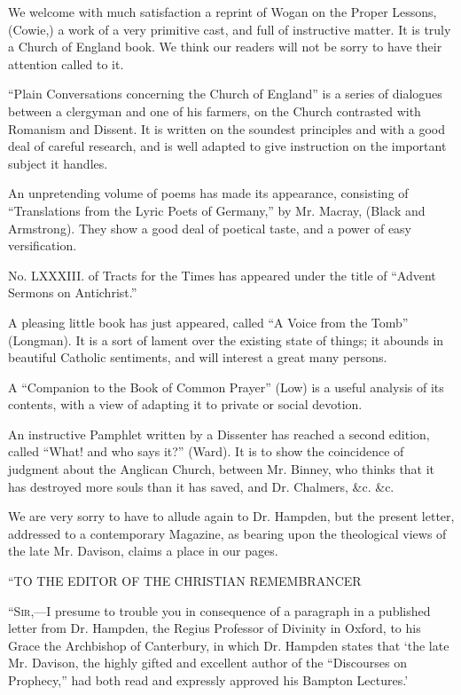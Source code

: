 We welcome with much satisfaction a reprint of
Wogan on the Proper Lessons, (Cowie,) a work of a very primitive cast,
and full of instructive matter. It is truly a Church of England book. We
think our readers will not be sorry to have their attention called to
it.

``Plain Conversations concerning the Church of
England'' is a series of dialogues between a clergyman and one of his
farmers, on the Church contrasted with Romanism and Dissent. It is
written on the soundest principles and with a good deal of careful
research, and is well adapted to give instruction on the important
subject it handles.

An unpretending volume of poems has made its
appearance, consisting of ``Translations from the Lyric Poets of Germany,''
by Mr. Macray, (Black and Armstrong). They show a good deal of poetical
taste, and a power of easy versification.

No. LXXXIII. of Tracts for the Times has appeared
under the title of ``Advent Sermons on Antichrist.''

A pleasing little book has just appeared, called ``A
Voice from the Tomb'' (Longman). It is a sort of lament over the existing
state of things; it abounds in beautiful Catholic sentiments, and will
interest a great many persons.

A ``Companion to the Book of Common Prayer'' (Low) is
a useful analysis of its contents, with a view of adapting it to private
or social devotion.

An instructive Pamphlet written by a Dissenter has
reached a second edition, called ``What! and who says it?'' (Ward). It is
to show the coincidence of judgment about the Anglican Church, between
Mr. Binney, who thinks that it has destroyed more souls than it has
saved, and Dr. Chalmers, \&c. \&c.

We are very sorry to have to allude again to Dr.
Hampden, but the present letter, addressed to a contemporary Magazine,
as bearing upon the theological views of the late Mr. Davison, claims a
place in our pages.

``TO THE EDITOR OF THE
CHRISTIAN REMEMBRANCER

``S\textsc{ir},—I presume to trouble
you in consequence of a paragraph in a published letter from Dr.
Hampden, the Regius Professor of Divinity in Oxford, to his Grace the
Archbishop of Canterbury, in which Dr. Hampden states that ‘the late
Mr. Davison, the highly gifted and excellent author of the ``Discourses
on Prophecy,'' had both read and expressly approved his Bampton Lectures.'

